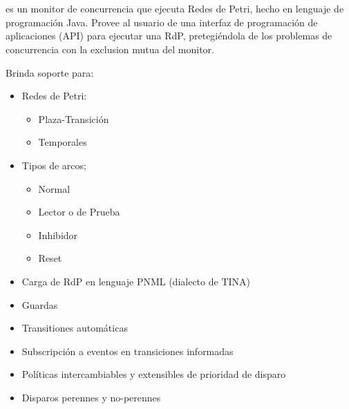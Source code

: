 \section{\javapetriconcurrencymonitor}
\label{sec:java_petri_concurrency_monitor}

\javapetriconcurrencymonitor es un monitor de concurrencia que ejecuta Redes
de Petri, hecho en lenguaje de programación Java.
Provee al usuario de una interfaz de programación de aplicaciones (API) para
ejecutar una RdP, pretegiéndola de los problemas de concurrencia con la
exclusion mutua del monitor.

Brinda soporte para:
\begin{itemize}
  \item Redes de Petri:
  \begin{itemize}
    \item Plaza-Transición
    \item Temporales
  \end{itemize}
  
  \item Tipos de arcos;
  \begin{itemize}
    \item Normal
    \item Lector o de Prueba
    \item Inhibidor
    \item Reset
  \end{itemize}
  
  \item Carga de RdP en lenguaje PNML (dialecto de TINA)
  \item Guardas
  \item Transitiones automáticas
  \item Subscripción a eventos en transiciones informadas
  \item Políticas intercambiables y extensibles de prioridad de disparo
  \item Disparos perennes y no-perennes

\end{itemize}
